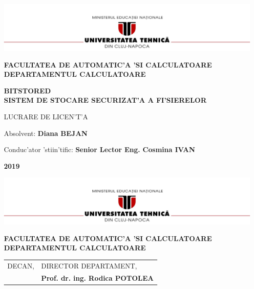 \documentclass[12pt,a4paper,twoside]{report}
\renewcommand{\thesisauthor}{Diana BEJAN}    %
\renewcommand{\thesisyear}{2019}      %
\renewcommand{\thesistitle}{BITSTORED \\SISTEM DE STOCARE SECURIZAT'A A FI'SIERELOR} %
\renewcommand{\thesissupervisor}{ Senior Lector Eng. Cosmina IVAN}
\newcommand{\department}{FACULTATEA DE AUTOMATIC'A 'SI CALCULATOARE\\
DEPARTAMENTUL CALCULATOARE}
\newcommand{\thesis}{LUCRARE DE LICEN'T'A}
\newcommand{\utcnlogo}{\includegraphics[width=15cm]{img/utcn.jpg}}
\begin{document}

\newenvironment{definition}[1][Defini'tie.]{\begin{trivlist}
\item[\hskip \labelsep {\bfseries #1}]}{\end{trivlist}}








\begin{center}
\utcnlogo

{\bf \department}

\vspace{4cm}

{\bf \thesistitle} %

\vspace{1.5cm}

\thesis

\vspace{6cm}

Absolvent: {\bf \thesisauthor} 

Conduc'ator 'stiin'tific: {\bf \thesissupervisor}

\vspace{3cm}
{\bf \thesisyear}
\end{center}

\thispagestyle{empty}
\newpage

\begin{center}
\utcnlogo

{\bf \department}
\end{center}
\vspace{0.5cm}

\begin{tabular}{p{7cm}p{8cm}}
 \hspace{-1cm}DECAN, & DIRECTOR DEPARTAMENT,\\
\hspace{-1cm}{\bf Prof. dr. ing. Liviu MICLEA} & {\bf Prof. dr. ing. Rodica POTOLEA}\\  
\end{tabular}
 
\vspace{2cm}
\end{document}
